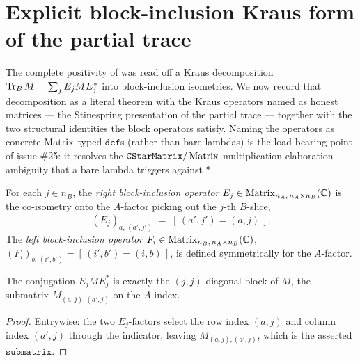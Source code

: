 \section{Explicit block-inclusion Kraus form of the partial trace}

The complete positivity of  was read off a Kraus decomposition
\(\operatorname{Tr}_B M = \sum_j E_j M E_j^{*}\) into block-inclusion isometries. We now record that
decomposition as a literal theorem with the Kraus operators named as honest matrices --- the
Stinespring presentation of the partial trace --- together with the two structural identities the
block operators satisfy. Naming the operators as concrete \(\operatorname{Matrix}\)-typed \(\texttt{def}\)s
(rather than bare lambdas) is the load-bearing point of issue \#25: it resolves the
\(\texttt{CStarMatrix}/\operatorname{Matrix}\) multiplication-elaboration ambiguity that a bare lambda triggers
against \(*\).

\begin{definition}\label{krausInclusionRight}
  \leanok
  For each \(j\in n_B\), the \emph{right block-inclusion operator}
  \(E_j\in\operatorname{Matrix}_{n_A,\,n_A\times n_B}(\mathbb{C})\) is the co-isometry onto the \(A\)-factor picking out the
  \(j\)-th \(B\)-slice,
  \[
    (E_j)_{a,\,(a',j')} \;=\; [\,(a',j') = (a,j)\,].
  \]
  The \emph{left block-inclusion operator} \(F_i\in\operatorname{Matrix}_{n_B,\,n_A\times n_B}(\mathbb{C})\),
  \((F_i)_{b,\,(i',b')} = [\,(i',b') = (i,b)\,]\), is defined symmetrically for the \(A\)-factor.
\end{definition}

\begin{lemma}\label{krausConjRight_eq_submatrix}
  \leanok
  The conjugation \(E_j M E_j^{*}\) is exactly the \((j,j)\)-diagonal block of \(M\), the submatrix
  \(M_{(a,j),(a',j)}\) on the \(A\)-index.
\end{lemma}
\begin{proof}\leanok
  Entrywise: the two \(E_j\)-factors select the row index \((a,j)\) and column index \((a',j)\)
  through the indicator, leaving \(M_{(a,j),(a',j)}\), which is the asserted \(\texttt{submatrix}\).
\end{proof}

